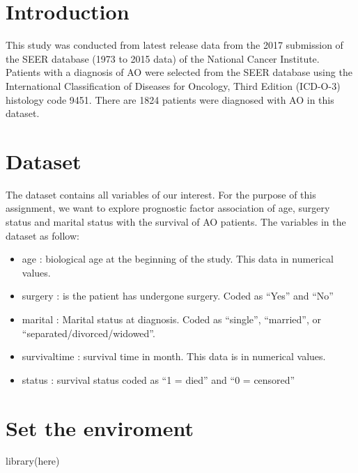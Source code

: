 \documentclass[
  10pt,
]{krantz}
\newenvironment{Shaded}{\begin{snugshade}}{\end{snugshade}}
\newcommand{\FunctionTok}[1]{\textcolor[rgb]{0.00,0.00,0.00}{#1}}
\newcommand{\NormalTok}[1]{#1}
\begin{document}
\hypertarget{introduction-7}{%
\section{Introduction}\label{introduction-7}}

This study was conducted from latest release data from the 2017 submission of the SEER database (1973 to 2015 data) of the National Cancer Institute. Patients with a diagnosis of AO were selected from the SEER database using the International Classification of Diseases for Oncology, Third Edition (ICD-O-3) histology code 9451. There are 1824 patients were diagnosed with AO in this dataset.

\hypertarget{dataset-5}{%
\section{Dataset}\label{dataset-5}}

The dataset contains all variables of our interest. For the purpose of this assignment, we want to explore prognostic factor association of age, surgery status and marital status with the survival of AO patients. The variables in the dataset as follow:

\begin{itemize}
\item
  age : biological age at the beginning of the study. This data in numerical values.
\item
  surgery : is the patient has undergone surgery. Coded as ``Yes'' and ``No''
\item
  marital : Marital status at diagnosis. Coded as ``single'', ``married'', or ``separated/divorced/widowed''.
\item
  survivaltime : survival time in month. This data is in numerical values.
\item
  status : survival status coded as ``1 = died'' and ``0 = censored''
\end{itemize}

\hypertarget{set-the-enviroment}{%
\section{Set the enviroment}\label{set-the-enviroment}}

\begin{Shaded}
\begin{Highlighting}[]
\FunctionTok{library}\NormalTok{(here)}
\end{Highlighting}
\end{Shaded}
\end{document}

